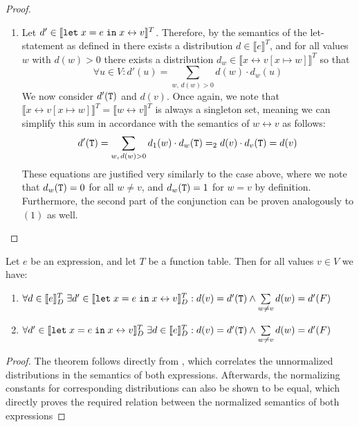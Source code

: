 \begin{proof}
\begin{enumerate}
		
		\item Let $d' \in \llbracket \texttt{let}\; x = e \;\texttt{in}\;  x \leftrightarrow v \rrbracket^T$.
		Therefore, by the semantics of the let-statement as defined in  there exists a distribution 
		$d \in \llbracket e \rrbracket^T$, and for all values $w$ with $d(w) > 0$ there exists a distribution $d_{w} \in \llbracket x\leftrightarrow v [x \mapsto w] \rrbracket^T$ so that 
		$$ \forall u \in V : d'(u) = \sum_{w,\, d(w) > 0} d(w) \cdot d_{w}(u)$$
		We now consider $d'(\texttt{T})$ and $d(v)$.
		Once again, we note that $\llbracket x\leftrightarrow v[x \mapsto w] \rrbracket^T = \llbracket w\leftrightarrow v \rrbracket^T$ is always a singleton set, meaning we can simplify this sum in accordance with the semantics of $w\leftrightarrow v$ as follows:
		$$ d'(\texttt{T}) = \sum_{w,\, d(w) > 0} d_1(w) \cdot d_{w}(\texttt{T}) =_2 d(v) \cdot d_v(\texttt{T}) = d(v) $$
		These equations are justified very similarly to the case above, where we note that $d_w(\texttt{T}) = 0$ for all $w \neq v$, and $d_w(\texttt{T}) = 1$ for $w = v$ by definition.
		Furthermore, the second part of the conjunction can be proven analogously to $(1)$ as well.
	\end{enumerate} 
\end{proof}


\begin{theorem}\label{theo:boolean_reduction_norm}
	Let $e$ be an \NDICE expression, and let $T$ be a function table.
	Then for all values $v \in V$ we have:
	\begin{enumerate}
		\item $\forall d \in \llbracket e \rrbracket_D^T \; \exists d' \in \llbracket \texttt{let}\; x = e \;\texttt{in}\;  x \leftrightarrow v\rrbracket_D^T: d(v) = d'(\texttt{T}) \land \sum\limits_{w \neq v} d(w) = d'(F)$
		\item $\forall d' \in \llbracket \texttt{let}\; x = e \;\texttt{in}\;  x \leftrightarrow v \rrbracket_D^T \; \exists d \in \llbracket e \rrbracket_D^T: d(v) = d'(\texttt{T}) \land \sum\limits_{w \neq v} d(w) = d'(F)$
	\end{enumerate}
\end{theorem}
\begin{proof}
	The theorem follows directly from , which correlates the unnormalized distributions in the semantics of both expressions.
	Afterwards, the normalizing constants for corresponding distributions can also be shown to be equal, which directly proves the required relation between the normalized semantics of both expressions
\end{proof}

